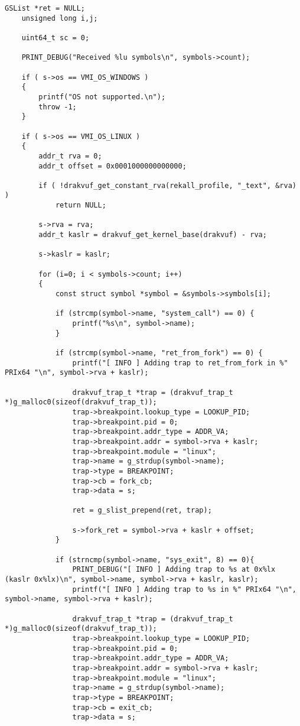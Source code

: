 {\begin{lstlisting}[style=CStyle]
	GSList *ret = NULL;
	unsigned long i,j;
	
	uint64_t sc = 0;
	
	PRINT_DEBUG("Received %lu symbols\n", symbols->count);
	
	if ( s->os == VMI_OS_WINDOWS )
	{
		printf("OS not supported.\n");
		throw -1;
	}
	
	if ( s->os == VMI_OS_LINUX )
	{
		addr_t rva = 0;
		addr_t offset = 0x0001000000000000;
		
		if ( !drakvuf_get_constant_rva(rekall_profile, "_text", &rva) )
			return NULL;
		
		s->rva = rva;
		addr_t kaslr = drakvuf_get_kernel_base(drakvuf) - rva;
		
		s->kaslr = kaslr;
		
		for (i=0; i < symbols->count; i++)
		{
			const struct symbol *symbol = &symbols->symbols[i];
			
			if (strcmp(symbol->name, "system_call") == 0) {
				printf("%s\n", symbol->name);
			}
			
			if (strcmp(symbol->name, "ret_from_fork") == 0) {
				printf("[ INFO ] Adding trap to ret_from_fork in %" PRIx64 "\n", symbol->rva + kaslr);
				
				drakvuf_trap_t *trap = (drakvuf_trap_t *)g_malloc0(sizeof(drakvuf_trap_t));
				trap->breakpoint.lookup_type = LOOKUP_PID;
				trap->breakpoint.pid = 0;
				trap->breakpoint.addr_type = ADDR_VA;
				trap->breakpoint.addr = symbol->rva + kaslr;
				trap->breakpoint.module = "linux";
				trap->name = g_strdup(symbol->name);
				trap->type = BREAKPOINT;
				trap->cb = fork_cb;
				trap->data = s;
				
				ret = g_slist_prepend(ret, trap);
				
				s->fork_ret = symbol->rva + kaslr + offset;
			}
			
			if (strncmp(symbol->name, "sys_exit", 8) == 0){
				PRINT_DEBUG("[ INFO ] Adding trap to %s at 0x%lx (kaslr 0x%lx)\n", symbol->name, symbol->rva + kaslr, kaslr);
				printf("[ INFO ] Adding trap to %s in %" PRIx64 "\n", symbol->name, symbol->rva + kaslr);
				
				drakvuf_trap_t *trap = (drakvuf_trap_t *)g_malloc0(sizeof(drakvuf_trap_t));
				trap->breakpoint.lookup_type = LOOKUP_PID;
				trap->breakpoint.pid = 0;
				trap->breakpoint.addr_type = ADDR_VA;
				trap->breakpoint.addr = symbol->rva + kaslr;
				trap->breakpoint.module = "linux";
				trap->name = g_strdup(symbol->name);
				trap->type = BREAKPOINT;
				trap->cb = exit_cb;
				trap->data = s;
				

\end{lstlisting}}
